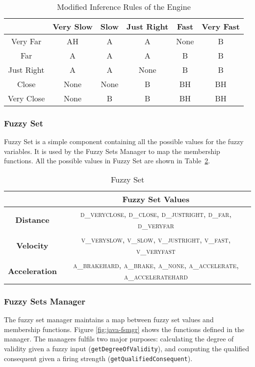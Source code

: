 \documentclass[12pt,letterpaper,oneside]{report}
\begin{document}
\begin{table}[h]
\centering
\caption{Modified Inference Rules of the Engine} \label{tbl:updated-rules}
\begin{tabular}{|c||c|c|c|c|c|}
\hline
            & Very Slow & Slow  & Just Right  & Fast  & Very Fast \\ \hline \hline
Very Far    & AH        & A     & A           & None  & B         \\ \hline
Far         & A         & A     & A           & B     & B         \\ \hline
Just Right  & A         & A     & None        & B     & B         \\ \hline
Close       & None      & None  & B           & BH    & BH        \\ \hline
Very Close  & None      & B     & B           & BH    & BH        \\ \hline
\hline
\end{tabular}
\end{table}

\subsubsection{Fuzzy Set}
Fuzzy Set is a simple component containing all the possible values for the
fuzzy variables. It is used by the Fuzzy Sets Manager to map the membership
functions. All the possible values in Fuzzy Set are shown in Table~\ref{tbl:fuzzyset}.

\begin{table}[h]
\centering
\caption{Fuzzy Set} \label{tbl:fuzzyset}
\begin{tabular}{|c|c|}
\hline
 & Fuzzy Set Values \\ \hline
\textbf{Distance} & \textsc{d\_veryclose}, \textsc{d\_close}, \textsc{d\_justright}, \textsc{d\_far}, \textsc{d\_veryfar} \\ 
\hline
\textbf{Velocity} & \textsc{v\_veryslow}, \textsc{v\_slow}, \textsc{v\_justright}, \textsc{v\_fast}, \textsc{v\_veryfast} \\
\hline
\textbf{Acceleration} & \textsc{a\_brakehard}, \textsc{a\_brake}, \textsc{a\_none}, \textsc{a\_accelerate}, \textsc{a\_acceleratehard} \\
\hline
\end{tabular}
\end{table}


\subsubsection{Fuzzy Sets Manager}
The fuzzy set manager maintains a map between fuzzy set values and membership
functions. Figure \ref{fig:java-fsmgr} shows the functions defined in the
manager. The managers fulfils two major purposes: calculating the degree
of validity given a fuzzy input (\texttt{getDegreeOfValidity}), and computing
the qualified consequent given a firing strength
(\texttt{getQualifiedConsequent}). 
\end{document}
